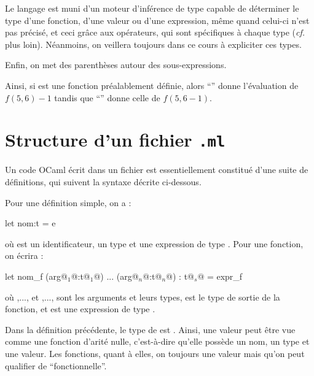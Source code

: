 \begin{Remarque}
	Le langage est muni d'un moteur d'inférence de type capable de déterminer le type d'une fonction, d'une valeur ou d'une expression, même quand celui-ci n'est pas précisé, et ceci grâce aux opérateurs, qui sont spécifiques à chaque type (\emph{cf.} plus loin). Néanmoins, on veillera toujours dans ce cours à expliciter ces types.
\end{Remarque}

Enfin, on met des parenthèses autour des sous-expressions.

\begin{Exemple}
	Ainsi, si  est une fonction préalablement définie, alors ``'' donne l'évaluation de \(f(5,6)-1\) tandis que ``'' donne celle de \(f(5,6-1)\).
\end{Exemple}

\pagebreak
\section{Structure d'un fichier \texttt{.ml}}
	
	Un code OCaml écrit dans un fichier  est essentiellement constitué d'une suite de définitions, qui suivent la syntaxe décrite ci-dessous.
	
	\begin{Syntaxe}[définitions]
	 \bdot Pour une définition simple, on a :
	 	\begin{Caml}
	 							let nom:t = e
	 	\end{Caml}
 	
 	où  est un identificateur,  un type et  une expression de type . \nll
 	\bdot Pour une fonction, on écrira : 
 		\begin{Caml}
		 			 let nom_f (arg@$_1$@:t@$_1$@) ... (arg@$_n$@:t@$_n$@) : t@$_s$@ =
		 				 expr_f
 		\end{Caml}
 	
 	où ,..., et ,..., sont les arguments et leurs types,  est le type de sortie de la fonction, et  est une expression de type .
 	\end{Syntaxe}
 	
 	\begin{Remarque}
 		Dans la définition précédente, le type de  est . \nt
 		Ainsi, une valeur peut être vue comme une fonction d'arité nulle, c'est-à-dire qu'elle possède un nom, un type et une valeur. Les fonctions, quant à elles, on toujours une valeur mais qu'on peut qualifier de ``fonctionnelle''.
 	\end{Remarque}
 
